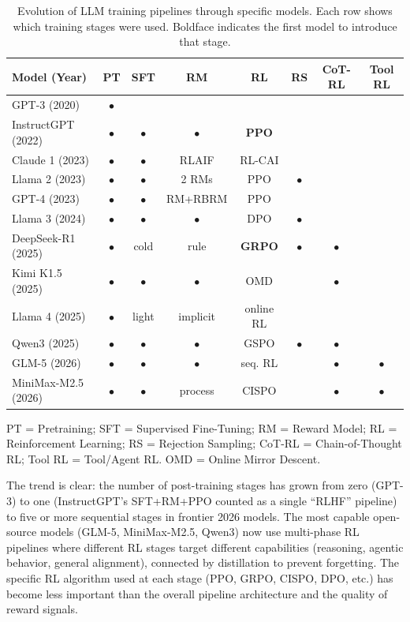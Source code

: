 \documentclass[12pt]{article}
\begin{document}
\begin{table}[h]
\centering
\small
\caption{Evolution of LLM training pipelines through specific models. Each row shows which training stages were used. Boldface indicates the first model to introduce that stage.}
\label{tab:pipeline_evolution}
\begin{tabular}{@{}p{2.8cm}ccccccc@{}}
\toprule
\textbf{Model (Year)} & \textbf{PT} & \textbf{SFT} & \textbf{RM} & \textbf{RL} & \textbf{RS} & \textbf{CoT-RL} & \textbf{Tool RL} \\
\midrule
GPT-3 (2020)           & $\bullet$ & & & & & & \\
InstructGPT (2022)     & $\bullet$ & $\bullet$ & $\bullet$ & \textbf{PPO} & & & \\
Claude 1 (2023)        & $\bullet$ & $\bullet$ & RLAIF & RL-CAI & & & \\
Llama 2 (2023)         & $\bullet$ & $\bullet$ & 2 RMs & PPO & $\bullet$ & & \\
GPT-4 (2023)           & $\bullet$ & $\bullet$ & RM+RBRM & PPO & & & \\
Llama 3 (2024)         & $\bullet$ & $\bullet$ & $\bullet$ & DPO & $\bullet$ & & \\
DeepSeek-R1 (2025)     & $\bullet$ & cold & rule & \textbf{GRPO} & $\bullet$ & $\bullet$ & \\
Kimi K1.5 (2025)       & $\bullet$ & $\bullet$ & $\bullet$ & OMD & & $\bullet$ & \\
Llama 4 (2025)         & $\bullet$ & light & implicit & online RL & & & \\
Qwen3 (2025)           & $\bullet$ & $\bullet$ & $\bullet$ & GSPO & $\bullet$ & $\bullet$ & \\
GLM-5 (2026)           & $\bullet$ & $\bullet$ & $\bullet$ & seq. RL & & $\bullet$ & $\bullet$ \\
MiniMax-M2.5 (2026)    & $\bullet$ & $\bullet$ & process & CISPO & & $\bullet$ & $\bullet$ \\
\bottomrule
\end{tabular}
\par\smallskip
\footnotesize PT = Pretraining; SFT = Supervised Fine-Tuning; RM = Reward Model; RL = Reinforcement Learning; RS = Rejection Sampling; CoT-RL = Chain-of-Thought RL; Tool RL = Tool/Agent RL. OMD = Online Mirror Descent.
\end{table}

The trend is clear: the number of post-training stages has grown from zero (GPT-3) to one (InstructGPT's SFT+RM+PPO counted as a single ``RLHF'' pipeline) to five or more sequential stages in frontier 2026 models. The most capable open-source models (GLM-5, MiniMax-M2.5, Qwen3) now use multi-phase RL pipelines where different RL stages target different capabilities (reasoning, agentic behavior, general alignment), connected by distillation to prevent forgetting. The specific RL algorithm used at each stage (PPO, GRPO, CISPO, DPO, etc.) has become less important than the overall pipeline architecture and the quality of reward signals.
\end{document}
